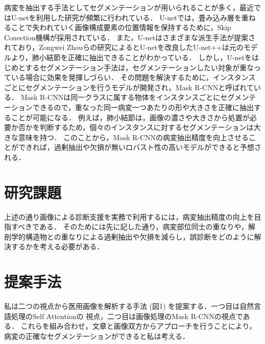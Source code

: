\documentclass[a4j,10pt,twocolumn]{jarticle}
\begin{document}
病変を抽出する手法としてセグメンテーションが用いられることが多く，最近ではU-netを利用した研究が頻繁に行われている\cite{近藤堅司2018u}．
U-netでは，畳み込み層を重ねることで失われていく画像構成要素の位置情報を保持するために，Skip Conection機構が採用されている．
また，U-netはさまざまな派生手法が提案されており，Zongwei Zhouらの研究によるとU-netを改良したU-net++\cite{zhou2018unet++}は元のモデルより，肺小結節を正確に抽出できることがわかっている．
しかし，U-netをはじめとするセグメンテーション手法は，セグメンテーションしたい対象が重なっている場合に効果を発揮しづらい．
その問題を解決するために，インスタンスごとにセグメンテーションを行うモデルが開発され，Mask R-CNNと呼ばれている\cite{he2017mask}．
Mask R-CNNは同一クラスに属する物体をインスタンスごとにセグメンテーションできるので，重なった同一病変一つあたりの形や大きさを正確に抽出することが可能になる．
例えば，肺小結節は，画像の濃さや大きさから処置が必要か否かを判断するため，個々のインスタンスに対するセグメンテーションは大きな意味を持つ．
このことから，Mask R-CNNの病変抽出精度を向上させることができれば，過剰抽出や欠損が無いロバスト性の高いモデルができると予想される．

\section{研究課題}
上述の通り画像による診断支援を実務で利用するには，病変抽出精度の向上を目指すべきである．
そのためには先に記した通り，病変部位同士の重なりや，解剖学的構造物との重なりによる過剰抽出や欠損を減らし，誤診断をどのように解決するかを考える必要がある．


\section{提案手法}
私は二つの視点から医用画像を解析する手法 (図1) を提案する．一つ目は自然言語処理のSelf Attention\cite{vaswani2017attention}の
視点，二つ目は画像処理のMask R-CNNの視点である．
これらを組み合わせ，文章と画像双方からアプローチを行うことにより，病変の正確なセグメンテーションができると私は考える．
\end{document}
